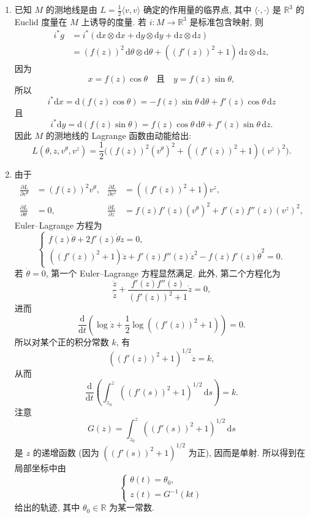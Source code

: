 \begin{description}[font=\normalfont,leftmargin=2em,labelwidth=1.5em]
\begin{enumerate}[label=(\alph*),ref=\alph*,leftmargin=*]
\item 已知 $M$ 的测地线是由 $L=\frac12\langle v,v\rangle$ 确定的作用量的临界点, 其中 $\langle\cdot,\cdot\rangle$ 是 $\mathbb{R}^3$ 的 Euclid 度量在 $M$ 上诱导的度量. 若 $i:M\to\mathbb{R}^3$ 是标准包含映射, 则
\begin{align*}
  i^*g&=i^*(\mathrm{d}x\otimes\mathrm{d}x+\mathrm{d}y\otimes\mathrm{d}y+\mathrm{d}z\otimes\mathrm{d}z)\\
      &=(f(z))^2\,\mathrm{d}\theta\otimes\mathrm{d}\theta
        +((f'(z))^2+1)\,\mathrm{d}z\otimes\mathrm{d}z,
\end{align*}
因为
\[
  x=f(z)\cos\theta\quad\text{且}\quad y=f(z)\sin\theta,
\]
所以
\[
  i^*\mathrm{d}x=\mathrm{d}(f(z)\cos\theta)
      =-f(z)\sin\theta\,\mathrm{d}\theta+f'(z)\cos\theta\,\mathrm{d}z
\]
且
\[
  i^*\mathrm{d}y=\mathrm{d}(f(z)\sin\theta)
      =f(z)\cos\theta\,\mathrm{d}\theta+f'(z)\sin\theta\,\mathrm{d}z.
\]
因此 $M$ 的测地线的 Lagrange 函数由动能给出:
\[
  L(\theta,z,v^\theta,v^z)
      =\frac12\bigl((f(z))^2(v^\theta)^2+((f'(z))^2+1)(v^z)^2\bigr).
\]
\item 由于
\begin{align*}
  \frac{\partial L}{\partial v^\theta}&=(f(z))^2v^\theta,&
  \frac{\partial L}{\partial v^z}&=((f'(z))^2+1)v^z,\\
  \frac{\partial L}{\partial\theta}&=0,&
  \frac{\partial L}{\partial z}&=f(z)f'(z)(v^\theta)^2+f'(z)f''(z)(v^z)^2,
\end{align*}
Euler–Lagrange 方程为
\[
  \begin{cases}
    f(z)\ddot\theta+2f'(z)\dot\theta\dot z=0,\\
    ((f'(z))^2+1)\ddot z+f'(z)f''(z)\dot z^2-f(z)f'(z)\dot\theta^2=0.
  \end{cases}
\]
若 $\dot\theta=0$, 第一个 Euler–Lagrange 方程显然满足. 此外, 第二个方程化为
\[
  \frac{\ddot z}{\dot z}+\frac{f'(z)f''(z)}{(f'(z))^2+1}\dot z=0,
\]
进而
\[
  \frac{\mathrm{d}}{\mathrm{d}t}\left(\log\dot z+\frac12\log((f'(z))^2+1)\right)=0.
\]
所以对某个正的积分常数 $k$, 有
\[
  ((f'(z))^2+1)^{1/2}\dot z=k,
\]
从而
\[
  \frac{\mathrm{d}}{\mathrm{d}t}\left(\int_{z_0}^z((f'(s))^2+1)^{1/2}\,\mathrm{d}s\right)=k.
\]
注意
\[
  G(z)=\int_{z_0}^z((f'(s))^2+1)^{1/2}\,\mathrm{d}s
\]
是 $z$ 的递增函数 (因为 $((f'(s))^2+1)^{1/2}$ 为正), 因而是单射. 所以得到在局部坐标中由
\[
  \begin{cases}
    \theta(t)=\theta_0,\\
    z(t)=G^{-1}(kt)
  \end{cases}
\]
给出的轨迹, 其中 $\theta_0\in\mathbb{R}$ 为某一常数.


\end{enumerate}
\end{description}
